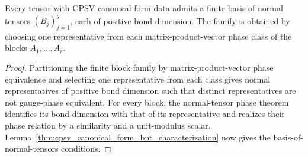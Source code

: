 \begin{theorem}
    \label{thm:cpsv_canonical_form_bnt_existence}
    \leanok
    Every tensor with CPSV canonical-form data admits a finite basis of
    normal tensors $(B_j)_{j=1}^{g}$, each of positive bond dimension. The
    family is obtained by choosing one representative from each
    matrix-product-vector phase class of the blocks $A_1,\ldots,A_r$.
\end{theorem}

\begin{proof}\leanok
    Partitioning the finite block family by matrix-product-vector phase
    equivalence and selecting one representative from each class gives normal
    representatives of positive bond dimension such that distinct
    representatives are not gauge-phase equivalent. For every block, the
    normal-tensor phase theorem identifies its bond dimension with that of
    its representative and realizes their phase relation by a similarity and
    a unit-modulus scalar.
    Lemma~\ref{thm:cpsv_canonical_form_bnt_characterization} now gives the
    basis-of-normal-tensors conditions.
\end{proof}

